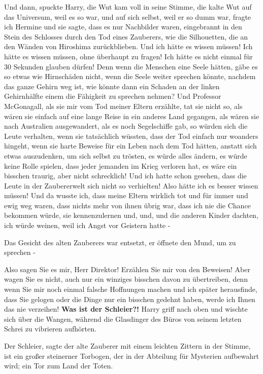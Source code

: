 \glqq Und dann\grqq{}, spuckte Harry, die Wut kam voll in seine Stimme, die
kalte Wut auf das Universum, weil es so war, und auf sich selbst, weil er so
dumm war, \glqq fragte ich Hermine und sie sagte, dass es nur Nachbilder waren,
eingebrannt in den Stein des Schlosses durch den Tod eines Zauberers, wie die
Silhouetten, die an den Wänden von Hiroshima zurückblieben. Und ich hätte es
wissen müssen! Ich hätte es wissen müssen, ohne überhaupt zu fragen! Ich hätte
es nicht einmal für 30 Sekunden glauben dürfen! Denn wenn die Menschen eine
Seele hätten, gäbe es so etwas wie Hirnschäden nicht, wenn die Seele weiter
sprechen könnte, nachdem das ganze Gehirn weg ist, wie könnte dann ein Schaden
an der linken Gehirnhälfte einem die Fähigkeit zu sprechen nehmen? Und Professor
McGonagall, als sie mir vom Tod meiner Eltern erzählte, tat sie nicht so, als
wären sie einfach auf eine lange Reise in ein anderes Land gegangen, als wären
sie nach Australien ausgewandert, als es noch Segelschiffe gab, so würden sich
die Leute verhalten, wenn sie tatsächlich wüssten, dass der Tod einfach nur
woanders hingeht, wenn sie harte Beweise für ein Leben nach dem Tod hätten,
anstatt sich etwas auszudenken, um sich selbst zu trösten, es würde alles
ändern, es würde keine Rolle spielen, dass jeder jemanden im Krieg verloren hat,
es wäre ein bisschen traurig, aber nicht schrecklich! Und ich hatte schon
gesehen, dass die Leute in der Zaubererwelt sich nicht so verhielten! Also hätte
ich es besser wissen müssen! Und da wusste ich, dass meine Eltern wirklich tot
und für immer und ewig weg waren, dass nichts mehr von ihnen übrig war, dass ich
nie die Chance bekommen würde, sie kennenzulernen und, und, und die anderen
Kinder dachten, ich würde weinen, weil ich Angst vor Geistern hatte -\grqq{}

Das Gesicht des alten Zauberers war entsetzt, er öffnete den Mund, um zu
sprechen -

\glqq Also sagen Sie es mir, Herr Direktor! Erzählen Sie mir von den Beweisen!
Aber wagen Sie es nicht, auch nur ein winziges bisschen davon zu übertreiben,
denn wenn Sie mir noch einmal falsche Hoffnungen machen und ich später
herausfinde, dass Sie gelogen oder die Dinge nur ein bisschen gedehnt haben,
werde ich Ihnen das nie verzeihen! \textbf{Was ist der Schleier?!}\grqq{} Harry
griff nach oben und wischte sich über die Wangen, während die Glasdinger des
Büros von seinem letzten Schrei zu vibrieren aufhörten.

\glqq Der Schleier\grqq{}, sagte der alte Zauberer mit einem leichten Zittern in
der Stimme, \glqq ist ein großer steinerner Torbogen, der in der Abteilung für
Mysterien aufbewahrt wird; ein Tor zum Land der Toten.\grqq{}

